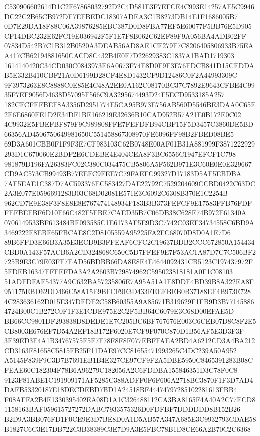 \documentclass[UTF8,fontset=fandol,zihao=-4,a4paper]{ctexart}
\begin{document}
{{C530906602614D1C2F67868032792D2C4D581E3F7EFCE4C993E14257AE5C9946DC22C2B65CB972DF7EFBEDC18307ADEA3C1B8273DB14E1F1686005B7
0D7E29DA18F88C06A39876285EBC387D0D8FBA77EF5E60077F5BB76E5D905CF14DBC232E62FC19E036942F5F1E7F8B062C62EF89F9A056BA4ADB02FF
07834D542B7C1B312B0520A3DEAB56AD8AE1CF279F7C8206405806933B75EAA417CB62194881650CACD8C432B4E0F7D22629383C1837A1BAD1719303
1614140420C34CD030C0843973E6A0673F74E8D0F9F3E76FDCB841D15CEDDAB5E332B410CBF21A0D6199D28CF4E8D1432CF9D12486C0F2A44993309C
9F3973263E8C8888C0E85E4C48A2EE0A162C08170BC37C7892E9643CFBE4C9935F7EF9056D4638D57095F566C9A3295674493D24F5ECD9533185A257
182CFCFEFBEF8A3356D2951774E5CA95B973E756AB560D5546BE3DAA0C65E2E6E6860FE1D2E34DF1BE166219E32636B10CAD952B57A21E0B172E0C02
4C9932E5FBEFBF879F9C989808FFE7FEFDFB94CBF15F5D3457C3860DE5BD66356AD4506750649981650C551458867308970FE6096FF98B2FBED08BE5
69D3A601CBB0F1F9F3E7CF983103C62B0748E00AF01B31A881999F3871222929293D1C670060E2BDF2E6CDEBE4E404CEA8F3BC6556C1947EFCF1C798
981879D196FA26383FC02C380C034475CB5806A5F562B971E3C60E0E0E329667CD9AC573CB99493B77EEFC9FEE7C79FAEFC99327D17183D5AF5EBDBA
7AF5EAE1C387D7AC593376EC583427DAE22792C7529204609CCBD0422C63DC2A3E077E0596691283B03C68D02081E571E3C6092C6308B370E1C2254B
962CD7E9E38F3F8E8E8E767474148934F183B3B373FEFCF9E17583FFB76FDFFEFBEFBF6D10F66C482F5FBE7CAED35B7C06DB38C628E74B972E61340A
0706149533BF613484BE093585C1E6173AF5E9D3C7742C03EF34734558C6BD9A3469222E8EBF65FBCAE8C2D8105559A95225FA2FC68070D8D0A1E7D6
89B6FFD3E66B3A35E3ECD9B3FFEAF6CFC2C19637BDB2CCC672850A154434CBD0A143F57ACB6A2CD324868C650C5D7FFEF9E7F53AC1A87D7C7C506BF2
725B9E3C79E03FF7EAD56BDBB66DA8E8E4E4644092431CB5123C197437972F5FDEB16347FFFEFDA3A2A2603B729874962C595023818181A0F1C08103
51ADFDFAF54377A9C632BA57235806E7A95A51A1E8DDE4BD39B8A322EA8F951175EBD62DD466C58A15E9BFCF9E3D433FEEEBEB0B37188EF4B973E728
4C283636162D015E347DEDE2C58B60355A9A85671B319629F1FB9D3B771458864724B00C1B272C0F1F3E1CDE975E2C2F5BB64C6079E3C68D00EFAE5D
BB66CC9801DF293838D8DEDE1E7C205BC6BF767676E003C6CEB07D8C8F2E5CB8003E676EF7D54A2EF18B172F6020E7CF9F070C870D1B56AF5E3D3F3F
3F39ED3F4A1B34767575F5F7F78F8F8F077EBFFAEA2BD4A6212CD3A4BA212CD3163F81658C5815FB25F11DAE97CC81655471993265C4DC239A50A952
A5145F839F9C3D7B7691EB1B4E327CE97CF9F2A5DBE5950C8465391283B08CFEAE60C182304F78B6A96279C182056A2C6FDDBA155846351D3C78F0C8
9123F81ABE1C191909171AF5285C388ADFF0F6F606A2718BC3870F1F3D7AD4DAFB53320187E18DECDEBD7BD1A24518BF44474797285102281613FBB4
F08AFFA2B4E1330395402EA08D1A1C326488112CA3BA8165F4A40A2C77ECD81158163BAF059615727272DABC7933575326D0FDFBF7DDDDDD8B152B26
B2D9A3BB076FD1F0CE9E3D7BE8D0A1D5AB57A347A685E3C9932793CDAE58B1827C6C3E17DB722C3B38389C3E7D9A3E5FBC78B1D8CE66A2B70C2C6368
}}
\end{document}
